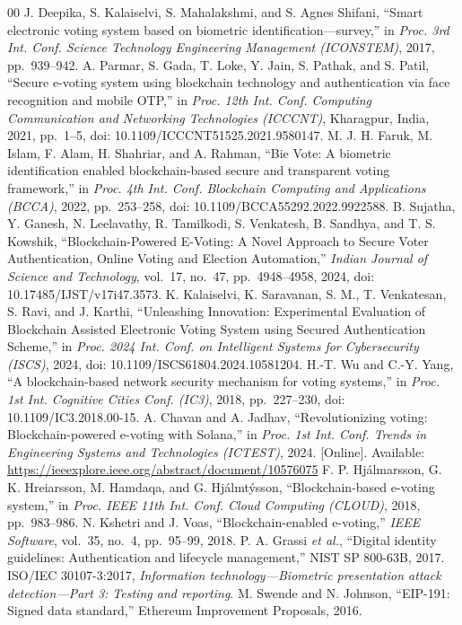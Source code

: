 \documentclass[conference]{IEEEtran}
\begin{document}
\begin{thebibliography}{00}
 J. Deepika, S. Kalaiselvi, S. Mahalakshmi, and S. Agnes Shifani, ``Smart electronic voting system based on biometric identification---survey,'' in \emph{Proc. 3rd Int. Conf. Science Technology Engineering Management (ICONSTEM)}, 2017, pp.~939--942.
 A. Parmar, S. Gada, T. Loke, Y. Jain, S. Pathak, and S. Patil, ``Secure e-voting system using blockchain technology and authentication via face recognition and mobile OTP,'' in \emph{Proc. 12th Int. Conf. Computing Communication and Networking Technologies (ICCCNT)}, Kharagpur, India, 2021, pp.~1--5, doi: 10.1109/ICCCNT51525.2021.9580147.
 M. J. H. Faruk, M. Islam, F. Alam, H. Shahriar, and A. Rahman, ``Bie Vote: A biometric identification enabled blockchain-based secure and transparent voting framework,'' in \emph{Proc. 4th Int. Conf. Blockchain Computing and Applications (BCCA)}, 2022, pp.~253--258, doi: 10.1109/BCCA55292.2022.9922588.
 B. Sujatha, Y. Ganesh, N. Leelavathy, R. Tamilkodi, S. Venkatesh, B. Sandhya, and T. S. Kowshik, ``Blockchain-Powered E-Voting: A Novel Approach to Secure Voter Authentication, Online Voting and Election Automation,'' \emph{Indian Journal of Science and Technology}, vol.~17, no.~47, pp.~4948--4958, 2024, doi: 10.17485/IJST/v17i47.3573.
 K. Kalaiselvi, K. Saravanan, S. M., T. Venkatesan, S. Ravi, and J. Karthi, ``Unleashing Innovation: Experimental Evaluation of Blockchain Assisted Electronic Voting System using Secured Authentication Scheme,'' in \emph{Proc. 2024 Int. Conf. on Intelligent Systems for Cybersecurity (ISCS)}, 2024, doi: 10.1109/ISCS61804.2024.10581204.
 H.-T. Wu and C.-Y. Yang, ``A blockchain-based network security mechanism for voting systems,'' in \emph{Proc. 1st Int. Cognitive Cities Conf. (IC3)}, 2018, pp.~227--230, doi: 10.1109/IC3.2018.00-15.
 A. Chavan and A. Jadhav, ``Revolutionizing voting: Blockchain-powered e-voting with Solana,'' in \emph{Proc. 1st Int. Conf. Trends in Engineering Systems and Technologies (ICTEST)}, 2024. [Online]. Available: \url{https://ieeexplore.ieee.org/abstract/document/10576075}
 F. P. Hj\'{a}lmarsson, G. K. Hrei\dh arsson, M. Hamdaqa, and G. Hj\'{a}lmt\'{y}sson, ``Blockchain-based e-voting system,'' in \emph{Proc. IEEE 11th Int. Conf. Cloud Computing (CLOUD)}, 2018, pp.~983--986.
 N. Kshetri and J. Voas, ``Blockchain-enabled e-voting,'' \emph{IEEE Software}, vol.~35, no.~4, pp.~95--99, 2018.
 P. A. Grassi \emph{et al.}, ``Digital identity guidelines: Authentication and lifecycle management,'' NIST SP 800-63B, 2017.
 ISO/IEC 30107-3:2017, \emph{Information technology---Biometric presentation attack detection---Part 3: Testing and reporting}.
 M. Swende and N. Johnson, ``EIP-191: Signed data standard,'' Ethereum Improvement Proposals, 2016.
\end{thebibliography}
\end{document}
